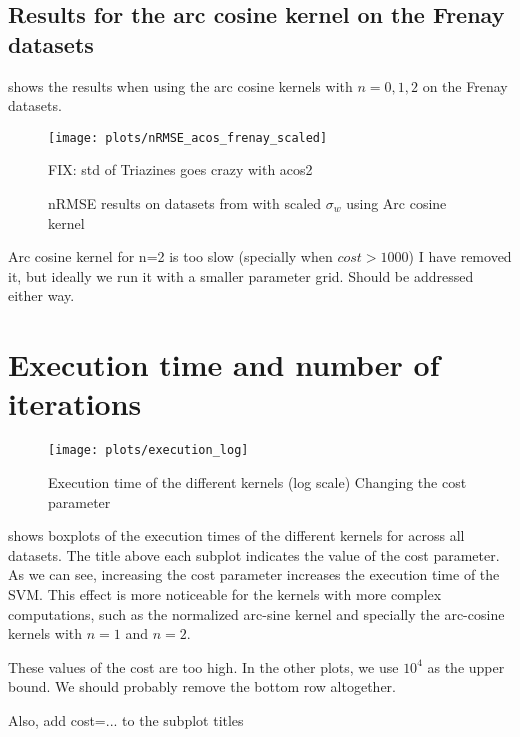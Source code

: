 \subsection{Results for the arc cosine kernel on the Frenay datasets}

 shows the results when using the arc cosine kernels
with $n=0,1,2$ on the Frenay datasets.

\begin{figure}[H]
    \texttt{[image: plots/nRMSE\_acos\_frenay\_scaled]}
    \begin{cnote}
        FIX: std of Triazines goes crazy with acos2
    \end{cnote}
    \caption{nRMSE results on datasets from \cite{frenayParameterinsensitiveKernelExtreme2011} with
        scaled $\sigma_w$ using Arc cosine kernel}%
    \label{fig:nrmse-acos-frenay-scaled}
\end{figure}

\begin{cnote}
    Arc cosine kernel for n=2 is too slow (specially when $cost>1000$)
    I have removed it, but ideally we run it with a smaller parameter grid.
    Should be addressed either way.
\end{cnote}


\section{Execution time and number of iterations}%
\label{sec:execution-time-and-number-of-iterations}

\begin{figure}[H]
    \texttt{[image: plots/execution\_log]}
    \caption{Execution time of the different kernels (log scale) Changing the cost
        parameter}%
    \label{fig:execution-log}
\end{figure}

 shows boxplots of the execution times of the different
kernels for across all datasets. The title above each subplot indicates the
value of the cost parameter. As we can see, increasing the cost parameter
increases the execution time of the SVM. This effect is more noticeable for the
kernels with more complex computations, such as the normalized arc-sine kernel
and specially the arc-cosine kernels with $n=1$ and $n=2$.

\begin{cnote}
    These values of the cost are too high.
    In the other plots, we use $10^4$ as the upper bound.
    We should probably remove the bottom row altogether.

    Also, add cost=... to the subplot titles
\end{cnote}

